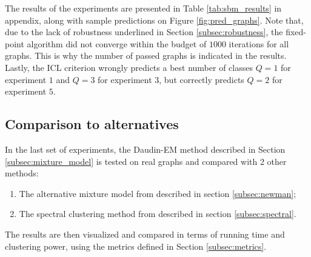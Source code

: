 \documentclass[switch, 12pt]{article}
\begin{document}
\begin{multicols}{2}
    The results of the experiments are presented in Table \ref{tab:sbm_results} in appendix, along with sample predictions on Figure \ref{fig:pred_graphs}. Note that, due to the lack of robustness underlined in Section \ref{subsec:robustness}, the fixed-point algorithm did not converge within the budget of $1000$ iterations for all graphs. This is why the number of passed graphs is indicated in the results. Lastly, the ICL criterion wrongly predicts a best number of classes $Q=1$ for experiment $1$ and $Q=3$ for experiment $3$, but correctly predicts $Q=2$ for experiment $5$.


    \subsection{Comparison to alternatives}

    In the last set of experiments, the Daudin-EM method \cite{main_article} described in Section \ref{subsec:mixture_model} is tested on real graphs and compared with 2 other methods:
    \begin{enumerate}
        \item The alternative mixture model from \cite{newman} described in section \ref{subsec:newman};
        \item The spectral clustering method from \cite{spectral} described in section \ref{subsec:spectral}.
    \end{enumerate}

    The results are then visualized and compared in terms of running time and clustering power, using the metrics defined in Section \ref{subsec:metrics}.

\end{multicols}
\end{document}

